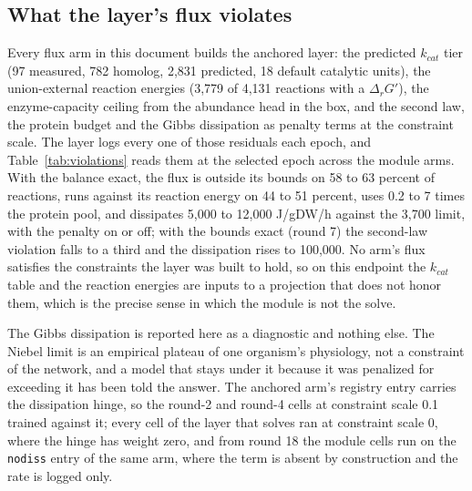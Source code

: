
\subsection{What the layer's flux violates}

Every flux arm in this document builds the anchored layer: the predicted $k_{cat}$ tier
(97 measured, 782 homolog, 2,831 predicted, 18 default catalytic units), the
union-external reaction energies (3,779 of 4,131 reactions with a $\Delta_r G'$), the
enzyme-capacity ceiling from the abundance head in the box, and the second law, the
protein budget and the Gibbs dissipation as penalty terms at the constraint scale. The
layer logs every one of those residuals each epoch, and Table~\ref{tab:violations}
reads them at the selected epoch across the module arms. With the balance exact, the
flux is outside its bounds on 58 to 63 percent of reactions, runs against its reaction
energy on 44 to 51 percent, uses 0.2 to 7 times the protein pool, and dissipates 5,000
to 12,000 J/gDW/h against the 3,700 limit, with the penalty on or off; with the bounds
exact (round 7) the second-law violation falls to a third and the dissipation rises to
100,000. No arm's flux satisfies the constraints the layer was built to hold, so on
this endpoint the $k_{cat}$ table and the reaction energies are inputs to a
projection that does not honor them, which is the precise sense in which the module
is not the solve.

The Gibbs dissipation is reported here as a diagnostic and nothing else. The Niebel
limit is an empirical plateau of one organism's physiology, not a constraint of the
network, and a model that stays under it because it was penalized for exceeding it has
been told the answer. The anchored arm's registry entry carries the dissipation hinge,
so the round-2 and round-4 cells at constraint scale 0.1 trained against it; every
cell of the layer that solves ran at constraint scale 0, where the hinge has weight
zero, and from round 18 the module cells run on the \texttt{nodiss} entry of the same
arm, where the term is absent by construction and the rate is logged only.



